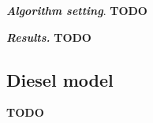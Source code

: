 \emph{\textbf{Algorithm setting}}.  {\bf TODO}



\emph{\textbf{Results.}}  {\bf TODO}


\subsection{Diesel model} \label{sec:diesel} {\bf TODO}

